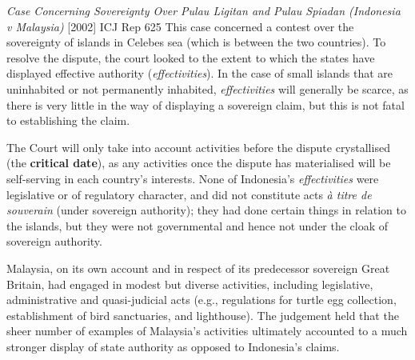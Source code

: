 \begin{casedetails}{\textit{Case Concerning Sovereignty Over Pulau Ligitan and Pulau Spiadan (Indonesia v Malaysia)} [2002] ICJ Rep 625}
    \flushleft
    This case concerned a contest over the sovereignty of islands in Celebes sea (which is between the two countries). To resolve the dispute, the court looked to the extent to which the states have displayed effective authority (\textit{effectivities}). In the case of small islands that are uninhabited or not permanently inhabited, \textit{effectivities} will generally be scarce, as there is very little in the way of displaying a sovereign claim, but this is not fatal to establishing the claim.

    \vspace{\baselineskip}

    The Court will only take into account activities before the dispute crystallised (the \textbf{critical date}), as any activities once the dispute has materialised will be self-serving in each country's interests. None of Indonesia's \textit{effectivities} were legislative or of regulatory character, and did not constitute acts \textit{à titre de souverain} (under sovereign authority); they had done certain things in relation to the islands, but they were not governmental and hence not under the cloak of sovereign authority.
    
    \vspace{\baselineskip}

    Malaysia, on its own account and in respect of its predecessor sovereign Great Britain, had engaged in modest but diverse activities, including legislative, administrative and quasi-judicial acts (e.g., regulations for turtle egg collection, establishment of bird sanctuaries, and lighthouse). The judgement held that the sheer number of examples of Malaysia's activities ultimately accounted to a much stronger display of state authority as opposed to Indonesia's claims.
\end{casedetails}


